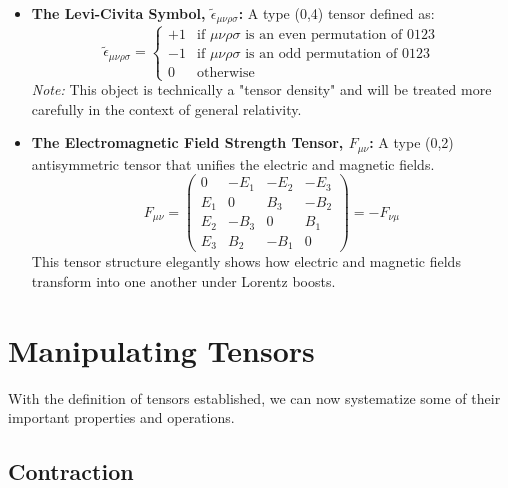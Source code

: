 \documentclass[11pt, a4paper]{report}
\begin{document}
\begin{itemize}
    \item \textbf{The Levi-Civita Symbol, $\tilde{\epsilon}_{\mu\nu\rho\sigma}$:} A type (0,4) tensor defined as:
    \begin{equation}
        \tilde{\epsilon}_{\mu\nu\rho\sigma} =
        \begin{cases}
            +1 & \text{if } \mu\nu\rho\sigma \text{ is an even permutation of } 0123 \\
            -1 & \text{if } \mu\nu\rho\sigma \text{ is an odd permutation of } 0123 \\
            0 & \text{otherwise}
        \end{cases}
    \end{equation}
    \textit{Note:} This object is technically a "tensor density" and will be treated more carefully in the context of general relativity.

    \item \textbf{The Electromagnetic Field Strength Tensor, $F_{\mu\nu}$:} A type (0,2) antisymmetric tensor that unifies the electric and magnetic fields.
    \begin{equation}\label{eq:EM Field Tensor}
        F_{\mu\nu} =
        \begin{pmatrix}
            0 & -E_1 & -E_2 & -E_3 \\
            E_1 & 0 & B_3 & -B_2 \\
            E_2 & -B_3 & 0 & B_1 \\
            E_3 & B_2 & -B_1 & 0
        \end{pmatrix}
        = -F_{\nu\mu}
    \end{equation}
    This tensor structure elegantly shows how electric and magnetic fields transform into one another under Lorentz boosts.
\end{itemize}
\section{Manipulating Tensors}

With the definition of tensors established, we can now systematize some of their important properties and operations.

\subsection*{Contraction}
\end{document}
